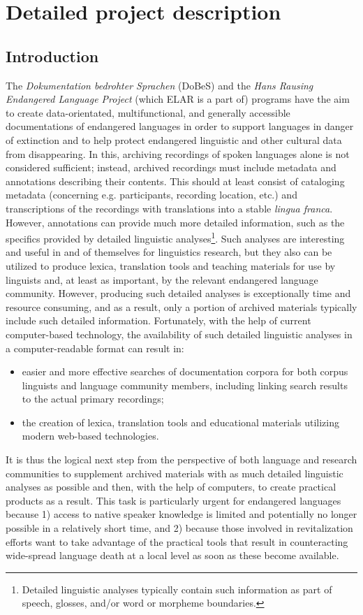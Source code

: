 \documentclass[a4paper,12pt]{article}
\begin{document}
\section{Detailed project description}
\subsection{Introduction}

The \textit{Dokumentation bedrohter Sprachen} (DoBeS) and the \textit{Hans Rausing Endangered Language Project} (which ELAR is a part of) programs have the aim to create data-orientated, multifunctional, and generally accessible documentations of endangered languages in order to support languages in danger of extinction and to help protect endangered linguistic and other cultural data from disappearing. In this, archiving recordings of spoken languages alone is not considered sufficient; instead, archived recordings must include metadata and annotations describing their contents. This should at least consist of cataloging metadata (concerning e.g. participants, recording location, etc.) and transcriptions of the recordings with translations into a stable \textit{lingua franca}. However, annotations can provide much more detailed information, such as the specifics provided by detailed linguistic analyses\footnote{Detailed linguistic analyses typically contain such information as part of speech, glosses, and/or word or morpheme boundaries.}. Such analyses are interesting and useful in and of themselves for linguistics research, but they also can be utilized to produce lexica, translation tools and teaching materials for use by linguists and, at least as important, by the relevant endangered language community. However, producing such detailed analyses is exceptionally time and resource consuming, and as a result, only a portion of archived materials typically include such detailed information. Fortunately, with the help of current computer-based technology, the availability of such detailed linguistic analyses in a computer-readable format can result in:
\begin{itemize}
\item easier and more effective searches of documentation corpora for both corpus linguists and language community members, including linking search results to the actual primary recordings;
\item the creation of lexica, translation tools and educational materials utilizing modern web-based technologies.
\end{itemize}
It is thus the logical next step from the perspective of both language and research communities to supplement archived materials with as much detailed linguistic analyses as possible and then, with the help of computers, to create practical products as a result. This task is particularly urgent for endangered languages because 1) access to native speaker knowledge is limited and potentially no longer possible in a relatively short time, and 2) because those involved in revitalization efforts want to take advantage of the practical tools that result in counteracting wide-spread language death at a local level as soon as these become available.
\end{document}
